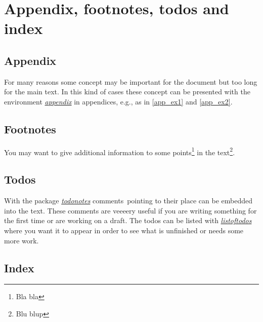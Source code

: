 \documentclass[a4paper]{book}
\newcommand{\imp}[1]{\underline{\textit{#1}}}
\begin{document}
\chapter{Appendix, footnotes, todos and index}


\section{Appendix}

For many reasons some concept may be important for the document but too long for the main text. In this kind of cases these concept can be presented with the environment \imp{appendix} in appendices, e.g., as in \autoref{app_ex1} and \autoref{app_ex2}.


\section{Footnotes}

You may want to give additional information to some points\footnote{Bla bla} in the text\footnote{Blu blup}.


\section{Todos}

With the package \imp{todonotes} comments\ pointing to their place can be embedded into the text. These comments are veeeery useful if you are writing something for the first time or are working on a draft. The todos can be listed with \imp{listoftodos} where you want it to appear in order to see what is unfinished or needs some more work.


\section{Index}
\end{document}
